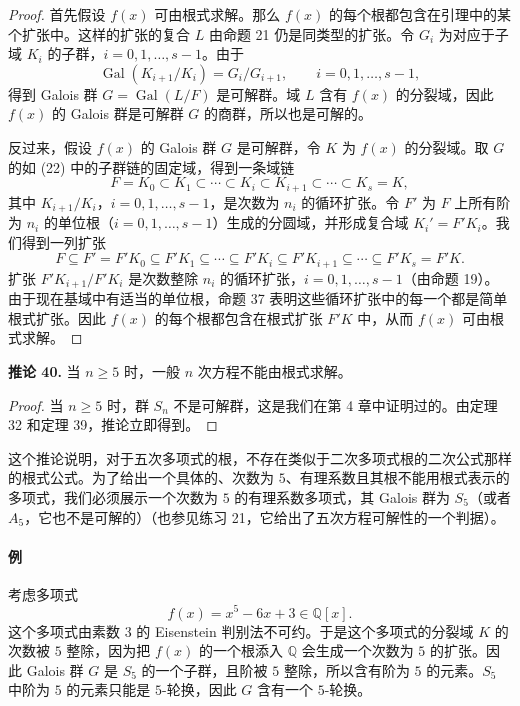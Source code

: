 \begin{proof}
首先假设 $f(x)$ 可由根式求解。那么 $f(x)$ 的每个根都包含在引理中的某个扩张中。这样的扩张的复合 $L$ 由命题 21 仍是同类型的扩张。令 $G_i$ 为对应于子域 $K_i$ 的子群，$i=0,1,\ldots,s-1$。由于
\[
\operatorname{Gal}(K_{i+1}/K_i)=G_i/G_{i+1},
\qquad i=0,1,\ldots,s-1,
\]
得到 Galois 群 $G=\operatorname{Gal}(L/F)$ 是可解群。域 $L$ 含有 $f(x)$ 的分裂域，因此 $f(x)$ 的 Galois 群是可解群 $G$ 的商群，所以也是可解的。

反过来，假设 $f(x)$ 的 Galois 群 $G$ 是可解群，令 $K$ 为 $f(x)$ 的分裂域。取 $G$ 的如 (22) 中的子群链的固定域，得到一条域链
\[
F=K_0\subset K_1\subset\cdots\subset K_i\subset K_{i+1}\subset\cdots\subset K_s=K,
\]
其中 $K_{i+1}/K_i$，$i=0,1,\ldots,s-1$，是次数为 $n_i$ 的循环扩张。令 $F'$ 为 $F$ 上所有阶为 $n_i$ 的单位根（$i=0,1,\ldots,s-1$）生成的分圆域，并形成复合域 $K_i'=F'K_i$。我们得到一列扩张
\[
F\subseteq F'=F'K_0\subseteq F'K_1\subseteq\cdots\subseteq F'K_i\subseteq F'K_{i+1}\subseteq\cdots\subseteq F'K_s=F'K.
\]
扩张 $F'K_{i+1}/F'K_i$ 是次数整除 $n_i$ 的循环扩张，$i=0,1,\ldots,s-1$（由命题 19）。由于现在基域中有适当的单位根，命题 37 表明这些循环扩张中的每一个都是简单根式扩张。因此 $f(x)$ 的每个根都包含在根式扩张 $F'K$ 中，从而 $f(x)$ 可由根式求解。
\end{proof}

\noindent\textbf{推论 40.} 当 $n\geq 5$ 时，一般 $n$ 次方程不能由根式求解。

\begin{proof}
当 $n\geq 5$ 时，群 $S_n$ 不是可解群，这是我们在第 4 章中证明过的。由定理 32 和定理 39，推论立即得到。
\end{proof}

这个推论说明，对于五次多项式的根，不存在类似于二次多项式根的二次公式那样的根式公式。为了给出一个具体的、次数为 $5$、有理系数且其根不能用根式表示的多项式，我们必须展示一个次数为 $5$ 的有理系数多项式，其 Galois 群为 $S_5$（或者 $A_5$，它也不是可解的）（也参见练习 21，它给出了五次方程可解性的一个判据）。

\paragraph{例}
考虑多项式
\[
f(x)=x^5-6x+3\in\mathbb Q[x].
\]
这个多项式由素数 $3$ 的 Eisenstein 判别法不可约。于是这个多项式的分裂域 $K$ 的次数被 $5$ 整除，因为把 $f(x)$ 的一个根添入 $\mathbb Q$ 会生成一个次数为 $5$ 的扩张。因此 Galois 群 $G$ 是 $S_5$ 的一个子群，且阶被 $5$ 整除，所以含有阶为 $5$ 的元素。$S_5$ 中阶为 $5$ 的元素只能是 $5$-轮换，因此 $G$ 含有一个 $5$-轮换。

